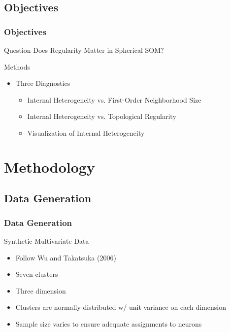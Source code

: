 \documentclass[nototal,handout]{beamer}
\begin{document}
\subsection{Objectives} 

\begin{frame}
	\frametitle{Objectives}
 
\begin{block}{Question}
  Does Regularity Matter in Spherical SOM?
 \end{block} 
\begin{block}{Methods}
 \begin{itemize}
 \item  Three Diagnostics
 \begin{itemize}
 \item  Internal Heterogeneity vs. First-Order Neighborhood Size
 \item  Internal Heterogeneity vs. Topological Regularity
 \item  Visualization of Internal Heterogeneity
 \end{itemize}
 \end{itemize}
 \end{block} \end{frame} 


\section{Methodology} 

\subsection{Data Generation} 

\begin{frame}
	\frametitle{Data Generation}
 
\begin{block}{Synthetic Multivariate Data}
 \begin{itemize}
 \item  Follow Wu and Takatsuka (2006)
 \item  Seven clusters
 \item  Three dimension
 \item  Clusters are normally distributed w/ unit variance on each dimension
 \item  Sample size varies to ensure adequate assignments to neurons
 \end{itemize}
 \end{block} \end{frame} 
\end{document}

